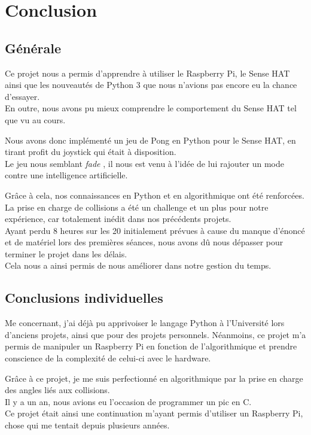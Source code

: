 \section{Conclusion}
\label{sec:conclusion}

\subsection{Générale}
\label{sec:generale}

Ce projet nous a permis d'apprendre à utiliser le Raspberry Pi, le Sense HAT
ainsi que les nouveautés de Python 3 que nous n'avions pas encore eu la chance
d'essayer. \\
En outre, nous avons pu mieux comprendre le comportement du Sense HAT tel que
vu au cours.

Nous avons donc implémenté un jeu de Pong en Python pour le Sense HAT, en tirant
profit du joystick qui était à disposition.\\
Le jeu nous semblant \og \textit{fade} \fg, il nous est venu à l'idée de lui
rajouter un mode contre une intelligence artificielle.

Grâce à cela, nos connaissances en Python et en algorithmique ont été renforcées. \\
La prise en charge de collisions a été un challenge et un plus pour notre
expérience, car totalement inédit dans nos précédents projets. \\

Ayant perdu 8 heures sur les 20 initialement prévues à cause du manque d'énoncé
et de matériel lors des premières séances, nous avons dû nous dépasser pour
terminer le projet dans les délais. \\
Cela nous a ainsi permis de nous améliorer dans notre gestion du temps.

\newpage

\subsection{Conclusions individuelles}
\label{sec:individuelles}

 \begin{fquote}Me concernant, j'ai déjà pu apprivoiser le
   langage Python à l'Université lors d'anciens projets, ainsi que pour des
   projets personnels. Néanmoins, ce projet m'a permis de manipuler un Raspberry
   Pi en fonction de l'algorithmique et prendre conscience de la complexité de
   celui-ci avec le hardware.
 \end{fquote}

 \begin{fquote}Grâce à ce projet, je me suis perfectionné en
 algorithmique par la prise en charge des angles liés aux collisions.\\
 Il y a un an, nous avions eu l'occasion de programmer un pic en C.\\
 Ce projet était ainsi une continuation m'ayant permis d'utiliser
 un Raspberry Pi, chose qui me tentait depuis plusieurs années.
 \end{fquote}

